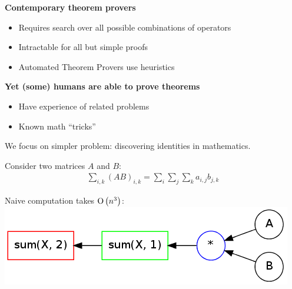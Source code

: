 \documentclass[landscape,a0b]{a0poster_csml_v2}
\begin{document}
\begin{poster}
\begin{PosterColumn}
\vspace{0.7cm}


\begin{minipage}[hc]{0.45\textwidth}
  {\bf Contemporary theorem provers}
  \begin{itemize}
    \item Requires search over all possible combinations of operators
    \item Intractable for all but simple proofs
    \item Automated Theorem Provers use heuristics
  \end{itemize}
\end{minipage}
\hfill
\begin{minipage}[hc]{0.45\textwidth}
  {\bf Yet (some) humans are able to prove theorems}
  \vspace{0.5cm}
  \begin{itemize} 
    \item Have experience of related problems 
    \item Known math ``tricks''
  \end{itemize} 
\end{minipage}

\vspace{1.2cm}
We focus on simpler problem: discovering identities in mathematics.


\begin{minipage}[hc]{0.45\textwidth}
  \centering
  Consider two matrices $A$ and $B$:
  \begin{align*}
    \sum_{i, k}(AB)_{i, k} = \sum_i \sum_j \sum_k a_{i,j} b_{j, k}
  \end{align*}
\end{minipage}
\hfill
\begin{minipage}[hc]{0.45\textwidth}
  \centering
  Naive computation takes $\operatorname{O}\left(n^3\right)$: 
  \includegraphics[width=0.9\linewidth]{imgs/example1_brute.png}
\end{minipage}
\vspace{1cm}


\end{PosterColumn}
\end{poster}
\end{document}
